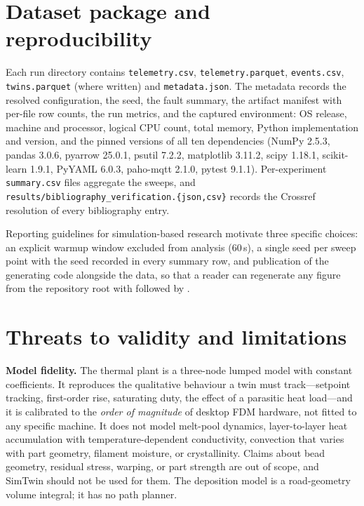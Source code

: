 \documentclass[preprint,12pt,authoryear,nopreprintline]{elsarticle}
\newcommand{\smt}{SimTwin}
\begin{document}
\section{Dataset package and reproducibility}
\label{sec:repro}
Each run directory contains \texttt{telemetry.csv}, \texttt{telemetry.parquet},
\texttt{events.csv}, \texttt{twins.parquet} (where written) and
\texttt{metadata.json}.
The metadata records the resolved configuration, the seed, the fault summary, the
artifact manifest with per-file row counts, the run metrics, and the captured
environment: OS release, machine and processor, logical CPU count, total memory,
Python implementation and version, and the pinned versions of all ten
dependencies (NumPy 2.5.3, pandas 3.0.6, pyarrow 25.0.1, psutil 7.2.2,
matplotlib 3.11.2, scipy 1.18.1, scikit-learn 1.9.1, PyYAML 6.0.3,
paho-mqtt 2.1.0, pytest 9.1.1).
Per-experiment \texttt{summary.csv} files aggregate the sweeps, and
\texttt{results/bibliography\_verification.\{json,csv\}} records the Crossref
resolution of every bibliography entry.

Reporting guidelines for simulation-based research \citep{rahmandad2012repro}
motivate three specific choices: an explicit warmup window excluded from analysis
(60\,s), a single seed per sweep point with the seed recorded in every summary
row, and publication of the generating code alongside the data, so that a reader
can regenerate any figure from the repository root with
 followed by .

\section{Threats to validity and limitations}
\label{sec:limitations}

\textbf{Model fidelity.} The thermal plant is a three-node lumped model with
constant coefficients. It reproduces the qualitative behaviour a twin must
track---setpoint tracking, first-order rise, saturating duty, the effect of a
parasitic heat load---and it is calibrated to the \emph{order of magnitude} of
desktop FDM hardware, not fitted to any specific machine.
It does not model melt-pool dynamics, layer-to-layer heat accumulation with
temperature-dependent conductivity, convection that varies with part geometry,
filament moisture, or crystallinity.
Claims about bead geometry, residual stress, warping, or part strength are out of
scope, and \smt{} should not be used for them.
The deposition model is a road-geometry volume integral; it has no path planner.
\end{document}
